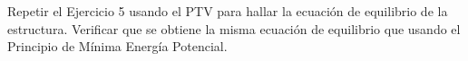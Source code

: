 %
%
%
%



\begin{exercise}
	
	Repetir el Ejercicio 5 usando el PTV para hallar la ecuación de equilibrio de la estructura. Verificar que se obtiene la misma ecuación de equilibrio que usando el Principio de Mínima Energía Potencial.
\end{exercise}


